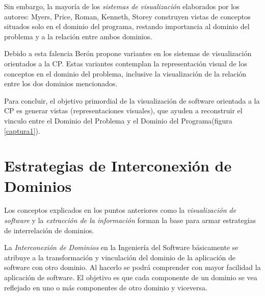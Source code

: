 \documentclass[a4paper,12pt]{report}
\begin{document}

 

Sin embargo, la mayoría de los \textit{sistemas de visualización} elaborados por los autores: Myers, Price, Roman, Kenneth, Storey \cite{MBPHRU10} construyen vistas de conceptos situados solo en el dominio del programa, restando importancia al dominio del problema y a la relación entre ambos dominios. 

Debido a esta falencia Berón \cite{MBPHRU10} propone variantes en los sistemas de visualización orientados a la CP. Estas variantes contemplan la representación visual de los conceptos en el dominio del problema, inclusive la visualización de la relación entre los dos dominios mencionados.

Para concluir, el objetivo primordial de la visualización de software orientada a la CP es generar vistas (representaciones visuales), que ayuden a reconstruir el vinculo entre el Dominio del Problema y el Dominio del Programa(figura \ref{captura1}). 


\section{Estrategias de Interconexión de \\Dominios}

Los conceptos explicados en los puntos anteriores como la \textit{visualización de software} y la \textit{extracción de la información} forman la base para armar estrategias de interrelación de dominios.

La \textit{Interconexión de Dominios} \cite{BRM10} en la Ingeniería del Software básicamente se atribuye a la transformación y vinculación del dominio de la aplicación de software con otro dominio. Al hacerlo se podrá comprender con mayor facilidad la aplicación de software. 
El objetivo es que cada componente de un dominio se vea reflejado en uno o más componentes de otro dominio y viceversa.%
\end{document}
